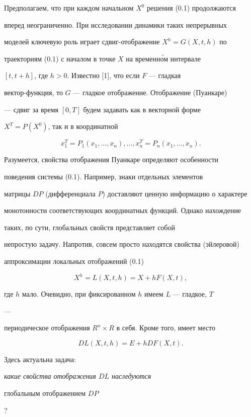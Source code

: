 Предполагаем, что при каждом начальном $X^0$ решения (0.1) продолжаются 


вперед неограниченно. При исследовании динамики таких непрерывных 


моделей ключевую роль играет сдвиг-отображение $X^h=G(X,t,h)$ по 


траекториям (0.1) с началом в точке $X$ на временн\'ом интервале 


$[t,t+h]$, где $h>0$. Известно [1], что если $F$ --- гладкая 


вектор-функция, то $G$ --- гладкое отображение. Отображение (Пуанкаре) 


--- сдвиг за время $[0,T]$ будем задавать как в векторной форме 


$X^T=P(X^0)$, так и в координатной 


$$ 


x^T_1=P_1(x_1,\dotsc,x_n),\dotsc,x^T_n=P_n(x_1,\dotsc,x_n). 


$$ 


Разумеется, свойства отображения Пуанкаре определяют особенности 


поведения системы (0.1). Например, знаки отдельных элементов 


матрицы $D P$ (дифференциала $P$) доставляют ценную информацию о характере 


монотонности соответствующих координатных функций. Однако нахождение 


таких, по сути, глобальных свойств представляет собой 


непростую задачу. Напротив, совсем просто находятся свойства (эйлеровой) 


аппроксимации локальных отображений (0.1)


$$ 


X^h=L(X,t,h)=X+h F(X,t), 


$$ 


где $h$ мало. Очевидно, при фиксированном $h$ имеем $L$ --- гладкое, $T$ 


--- 


периодическое отображения $R^n\times R$ в себя. Кроме того, имеет место 


\begin{equation} 


D L(X,t,h)=E+h D F(X,t). \tag{0.2}


\end{equation} 


Здесь актуальна задача: {\it какие свойства отображения $D L$ наследуются 


глобальным отображением $D P$}? 


